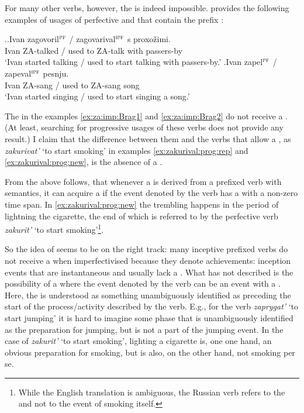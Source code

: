 For many other verbs, however, the  is indeed impossible. \citet{Braginsky:08} provides the following examples of usages of perfective and  that contain the  prefix :

\ex.\label{ex:za:imp:Brag}\ag.\label{ex:za:imp:Brag1}Ivan zagovoril$^{\textsc{pf}}$ / zagovarival$^{\textsc{ipf}}$ s proxo\v{z}imi.\\
Ivan ZA-talked / {used to ZA-talk} with passers-by\\
\trans `Ivan started talking / used to start talking with passers-by.'
\bg.\label{ex:za:imp:Brag2}Ivan zapel$^{\textsc{pf}}$ / zapeval$^{\textsc{ipf}}$ pesnju.\\
Ivan ZA-sang / {used to ZA-sang} song\\
\trans `Ivan started singing / used to start singing a song.'\\

The  in the examples \ref{ex:za:imp:Brag1} and \ref{ex:za:imp:Brag2} do not receive a . (At least, searching for progressive usages of these verbs does not provide any result.) I claim that the difference between them and the verbs that allow a , as \textit{zakurivat'} `to start smoking' in examples \ref{ex:zakurival:prog:rep} and \ref{ex:zakurival:prog:new}, is the absence of a . 

From the above follows, that whenever a  is derived from a  prefixed verb with  semantics, it can acquire a  if the event denoted by the verb has a  with a non-zero time span. In \ref{ex:zakurival:prog:new} the trembling happens in the period of lightning the cigarette, the end of which is referred to by the perfective verb \textit{zakurit'} `to start smoking'\footnote{While the English translation is ambiguous, the Russian verb refers to the  and not to the event of smoking itself.}. 

So the idea of \citet{Braginsky:08} seems to be on the right track: many inceptive prefixed verbs do not receive a  when imperfectivised because they denote achievements: inception events that are instantaneous and usually lack a . What \citet{Braginsky:08} has not described is the possibility of a  where the event denoted by the verb can be  an event with a . Here, the  is understood as something unambiguously identified as preceding the start of the process/activity described by the  verb. E.g., for the verb \textit{zaprygat'} `to start jumping' it is hard to imagine some phase that is unambiguously identified as the preparation for jumping, but is not a part of the jumping event. In the case of \textit{zakurit'} `to start smoking', lighting a cigarette is, one one hand, an obvious preparation for smoking, but is also, on the other hand, not smoking per se. 

